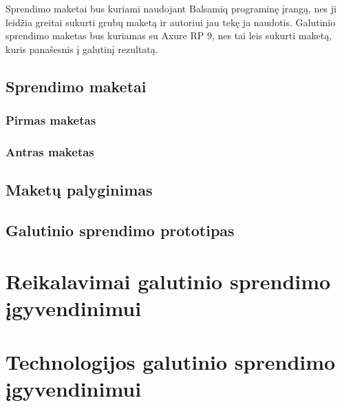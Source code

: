 \documentclass{VUMIFPSkursinis}
\begin{document}
Sprendimo maketai bus kuriami naudojant Balsamiq programinę įrangą, nes ji leidžia greitai sukurti grubų maketą ir autoriui jau tekę ja naudotis. Galutinio sprendimo maketas bus kuriamas su Axure RP 9, nes tai leis sukurti maketą, kuris panašesnis į galutinį rezultatą.

\subsection{Sprendimo maketai}
\subsubsection{Pirmas maketas}

\subsubsection{Antras maketas}

\subsection{Maketų palyginimas}
\subsection{Galutinio sprendimo prototipas}

\section{Reikalavimai galutinio sprendimo įgyvendinimui}
\section{Technologijos galutinio sprendimo įgyvendinimui}




\printbibliography[heading=bibintoc, title=Šaltiniai]  %
\end{document}
